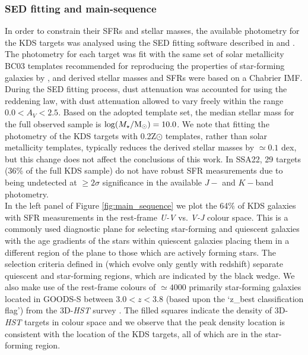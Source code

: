 \documentclass[fleqn,usenatbib]{mn2e}
\begin{document}
\subsubsection{SED fitting and main-sequence}\label{subsubsec:sed_fitting}
In order to constrain their SFRs and stellar masses, the available photometry for the KDS targets was analysed using the SED fitting software described in \cite{McLure2011} and \cite{McLeod2015}.
The photometry for each target was fit with the same set of solar metallicity BC03 \citep{Bruzual2003} templates recommended for reproducing the properties of star-forming galaxies by \cite{Wuyts2011a}, and derived stellar masses and SFRs were based on a Chabrier IMF.
During the SED fitting process, dust attenuation was accounted for using the \cite{Calzetti2000} reddening law, with dust attenuation allowed to vary freely within the range $0.0<A_{V}<2.5$.
Based on the adopted template set, the median stellar mass for the full observed sample is $\log(M_{\star}/{\rm M}_{\odot}) = 10.0$. 
We note that fitting the photometry of the KDS targets with 0.2Z$\odot$ templates, rather than solar metallicity templates, typically reduces the derived stellar masses by $\simeq0.1$ dex, but this change does not affect the conclusions of this work.
In SSA22, 29 targets (36\% of the full KDS sample) do not have robust SFR measurements due to being undetected at $\geq 2\sigma$ significance in the available $J-$ and $K-$band photometry. \\

In the left panel of Figure \ref{fig:main_sequence} we plot the 64\% of KDS galaxies with SFR measurements in the rest-frame {\it U-V} vs. {\it V-J} colour space.
This is a commonly used diagnostic plane for selecting star-forming and quiescent galaxies \citep[e.g.][]{Williams2009,Brammer2011,Whitaker2012a} with the age gradients of the stars within quiescent galaxies placing them in a different region of the plane to those which are actively forming stars.
The selection criteria defined in \cite{Whitaker2012a} (which evolve only gently with redshift) separate quiescent and star-forming regions, which are indicated by the black wedge.
We also make use of the rest-frame colours of $\simeq4000$ primarily star-forming galaxies located in GOODS-S between $3.0 < z < 3.8$ (based upon the `z\_best classification flag') from the 3D-{\em HST} survey \citep{Brammer2012,Momcheva2016}.
The filled squares indicate the density of 3D-{\em HST} targets in colour space and we observe that the peak density location is consistent with the location of the KDS targets, all of which are in the star-forming region. 
\end{document}

